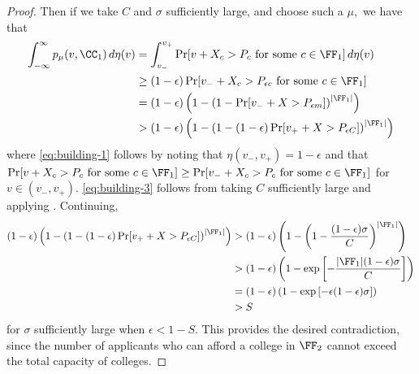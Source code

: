 \documentclass[10pt]{article}
\begin{document}
\begin{ReviewVerbatim}
\begin{proof}
    Then if we take $C$ and $\sigma$ sufficiently large, and choose such a $\mu,$ we have that
    \begin{align}
        \int_{-\infty}^\infty p_\mu(v, \CC_1)\,d\eta(v)
        &= \int_{v_-}^{v_+} \Pr[v + X_c > P_c\text{ for some $c\in \FF_1$}]\,d\eta(v)\\
        &\ge (1 - \epsilon) \Pr[v_- + X_c > P_{\epsilon c}\text{ for some $c\in \FF_1$}] \label{eq:building-1}\\
        &= (1-\epsilon)\left( 1 - \left(1 - \Pr[v_- + X > P_{\epsilon m}]\right)^{|\FF_1|}\right) \label{eq:building-2}\\
        &> (1-\epsilon)\left(1 - \left(1 - (1-\epsilon)\Pr[v_+ + X > P_{\epsilon C}]\right)^{|\FF_1|}\right) \label{eq:building-3}
    \end{align}
    where \eqref{eq:building-1} follows by noting that $\eta(v_-, v_+)=1-\epsilon$ and that $\Pr[v + X_c > P_c\text{ for some $c\in \FF_1$}] \ge \Pr[v_- + X_c > P_c\text{ for some $c\in \FF_1$}]$ for $v\in (v_-,v_+).$ \eqref{eq:building-3} follows from taking $C$ sufficiently large and applying . Continuing,
    \begin{align}
        (1-\epsilon)\left(1 - \left(1 - (1-\epsilon)\Pr[v_+ + X > P_{\epsilon C}]\right)^{|\FF_1|}\right)
        &> (1-\epsilon)\left(1 - \left(1 - \frac{(1-\epsilon)\sigma}{C}\right)^{|\FF_1|}\right)\\
        &> (1-\epsilon)\left(1 - \exp\left[- \frac{|\FF_1|(1-\epsilon)\sigma}{C}\right]\right)\\
        &= (1-\epsilon)\left(1 - \exp\left[-\epsilon(1-\epsilon)\sigma\right]\right)\\
        &> S
    \end{align}
    for $\sigma$ sufficiently large when $\epsilon < 1 - S$. This provides the desired contradiction, since the number of applicants who can afford a college in $\FF_2$ cannot exceed the total capacity of colleges.
\end{proof}


\end{ReviewVerbatim}
\end{document}
